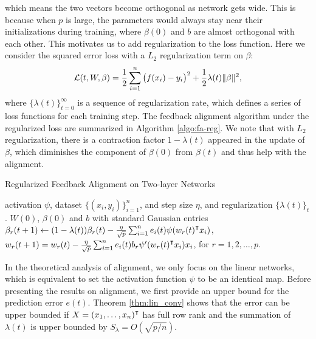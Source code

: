 which means the two vectors become orthogonal as network gets wide. This is because when $p$ is large, the parameters would always stay near their initializations during training, where $\beta(0)$ and $b$ are almost orthogonal with each other. This motivates us to add regularization to the loss function. Here we consider the squared error loss with a $L_2$ regularization term on $\beta$:
\begin{equation}
\label{eqn:loss-with-reg}
\mathcal{L}(t, W, \beta) = \frac{1}{2}\sum_{i=1}^n\big(f(x_i)-y_i\big)^2 + \frac{1}{2}\lambda(t)\|\beta\|^2,
\end{equation}
where $\{\lambda(t)\}_{t=0}^\infty$ is a sequence of regularization rate, which defines a series of loss functions for each training step. The feedback alignment algorithm under the regularized loss are summarized in Algorithm \ref{algo:fa-reg}. We note that with $L_2$ regularization, there is a contraction factor $1-\lambda(t)$ appeared in the update of $\beta$, which diminishes the component of $\beta(0)$ from $\beta(t)$ and thus help with the alignment.

\begin{algorithm}[H]
\centering
\caption{Regularized Feedback Alignment on Two-layer Networks}\label{algo:fa-reg}
    \begin{algorithmic}[1]
        \Require activation $\psi$, dataset $\{(x_i,y_i)\}_{i=1}^n$, and step size $\eta$, and regularization $\{\lambda(t)\}_t$.
         $W(0)$, $\beta(0)$ and $b$ with standard Gaussian entries
            \State $\beta_r(t+1) \gets (1-\lambda(t))\beta_r(t) - \frac{\eta}{\sqrt p} \sum_{i=1}^n e_i(t)\psi(w_r(t)\transpose x_i)$,
            \State $w_r(t+1) = w_r(t) - \frac{\eta}{\sqrt{p}} \sum_{i=1}^n e_i(t) b_r\psi'(w_r(t)\transpose x_i)x_i$, for $r=1,2,\ldots,p$.
        \EndWhile
    \end{algorithmic}    
\end{algorithm}

In the theoretical analysis of alignment, we only focus on the linear networks, which is equivalent to set the activation function $\psi$ to be an identical map. Before presenting the results on alignment, we first provide an upper bound for the prediction error $e(t)$. Theorem \ref{thm:lin_conv} shows that the error can be upper bounded if $X = (x_1,\ldots,x_n)\transpose$ has full row rank and the summation of $\lambda(t)$ is upper bounded by $S_\lambda = O(\sqrt{p/n})$.

